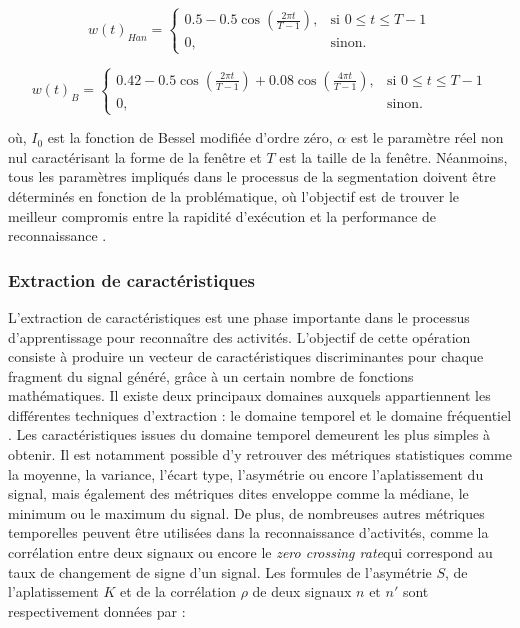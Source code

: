 \begin{equation}
	\label{eq:hann}
	w\left(t\right)_{Han} = \left\{
	\begin{array}{ll}
		0.5-0.5\cos(\frac{2\pi t}{T-1}), & \mbox{si } 0 \leq t \leq T-1 \\
		0, & \mbox{sinon.}
	\end{array}
	\right.
\end{equation}

\begin{equation}
	\label{eq:blackman}
	w\left(t\right)_B = \left\{
	\begin{array}{ll}
		0.42-0.5\cos(\frac{2\pi t}{T-1}) + 0.08\cos(\frac{4\pi t}{T-1}), & \mbox{si } 0 \leq t \leq T-1 \\
		0,                                    & \mbox{sinon.}
	\end{array}
	\right.
\end{equation}

\noindent où, $I_0 $ est la fonction de Bessel modifiée d'ordre zéro, $\alpha$ est le paramètre réel non nul caractérisant la forme de la fenêtre et $T$ est la taille de la fenêtre. Néanmoins, tous les paramètres impliqués dans le processus de la segmentation doivent être déterminés en fonction de la problématique, où l'objectif est de trouver le meilleur compromis entre la rapidité d'exécution et la performance de reconnaissance \citep{Banos2014}.

\subsubsection{Extraction de caractéristiques}

L'extraction de caractéristiques est une phase importante dans le processus d'apprentissage pour reconnaître des activités. L'objectif de cette opération consiste à produire un vecteur de caractéristiques discriminantes pour chaque fragment du signal généré, grâce à un certain nombre de fonctions mathématiques. Il existe deux principaux domaines auxquels appartiennent les différentes techniques d'extraction : le domaine temporel et le domaine fréquentiel \citep{Huynh2005, Figo2010, Cleland2013}. Les caractéristiques issues du domaine temporel demeurent les plus simples à obtenir. Il est notamment possible d'y retrouver des métriques statistiques comme la moyenne, la variance, l'écart type, l'asymétrie ou encore l'aplatissement du signal, mais également des métriques dites \og enveloppe \fg comme la médiane, le minimum ou le maximum du signal. De plus, de nombreuses autres métriques temporelles peuvent être utilisées dans la reconnaissance d'activités, comme la corrélation entre deux signaux ou encore le \textit{zero crossing rate}\textemdash qui correspond au taux de changement de signe d'un signal. Les formules de l'asymétrie $S$, de l'aplatissement $K$ et de la corrélation $\rho$ de deux signaux $n \mbox{ et } n'$ sont respectivement données par :

